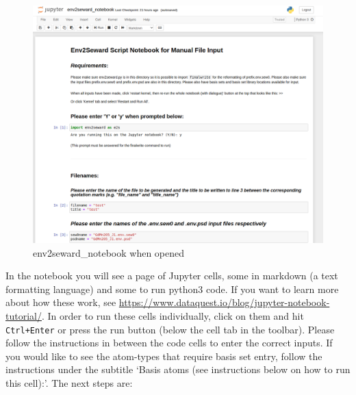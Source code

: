 \documentclass[10pt]{article}
\begin{document}
\begin{figure}
	\centering
	\includegraphics[width=1.3\linewidth]{"notebook.png"}
	\caption{env2seward\_notebook when opened}
	\label{fig:screenshot-from-2020-06-23-12-26-25}
\end{figure}

In the notebook you will see a page of Jupyter cells, some in markdown (a text formatting language) and some to run python3 code. If you want to learn more about how these work, see \url{https://www.dataquest.io/blog/jupyter-notebook-tutorial/}. In order to run these cells individually, click on them and hit \texttt{Ctrl+Enter} or press the run button (below the cell tab in the toolbar). Please follow the instructions in between the code cells to enter the correct inputs.
If you would like to see the atom-types that require basis set entry, follow the instructions under the subtitle `Basis atoms (see instructions below on how to run this cell):'. The next steps are:
\end{document}
